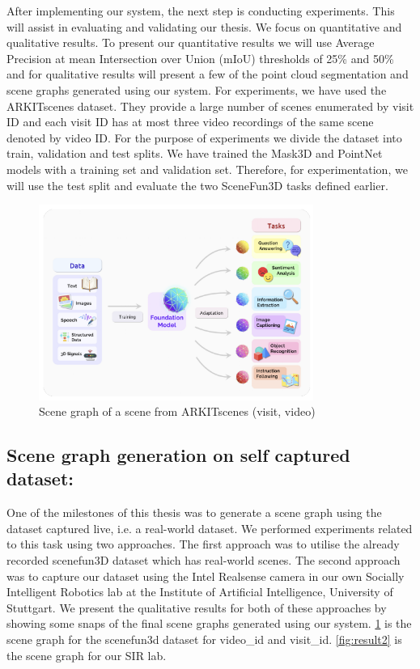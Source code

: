 After implementing our system, the next step is conducting experiments. This will assist in evaluating and validating our thesis.
We focus on quantitative and qualitative results. To present our quantitative results we will use Average Precision at mean Intersection over Union (mIoU) thresholds of 
25\% and 50\% and for qualitative results will present a few of the point cloud segmentation and scene graphs generated using our system. 
For experiments, we have used the ARKITscenes dataset. They provide a large number of scenes enumerated by visit ID and each visit ID has at most three 
video recordings of the same scene denoted by video ID. For the purpose of experiments we divide the dataset into train, validation and test splits. We have trained
the Mask3D and PointNet models with a training set and validation set. Therefore, for experimentation, we will use the test split and evaluate the two SceneFun3D tasks defined 
earlier.
\begin{figure}[ht!]
    \centering
    \includegraphics[width=0.8\textwidth]{images/FoundationModels.png}
    \caption{Scene graph of a scene from ARKITscenes (visit, video)}
    \label{fig:result1}
\end{figure}
\subsection{Scene graph generation on self captured dataset:}
One of the milestones of this thesis was to generate a scene graph using the dataset captured live, i.e. a real-world dataset. We performed experiments related to
 this task using two approaches. The first approach was to utilise the already recorded scenefun3D dataset which has real-world scenes. The second approach was 
to capture our dataset using the Intel Realsense camera in our own Socially Intelligent Robotics lab at the Institute of Artificial Intelligence, 
University of Stuttgart. We present the qualitative results for both of these approaches by showing some snaps of the final scene graphs generated 
using our system. \cref{fig:result1} is the scene graph for the scenefun3d dataset for video\_id\: and visit\_id\:. \cref{fig:result2} 
is the scene graph for our SIR lab.

